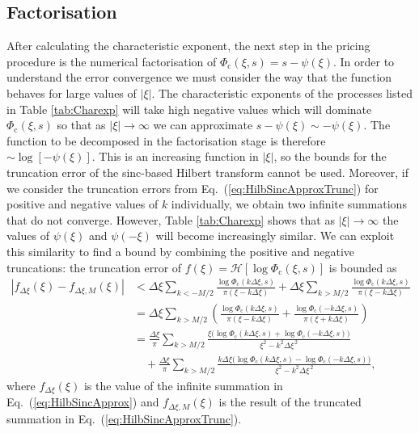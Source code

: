 \documentclass[11pt,a4paper]{article}
\begin{document}
\subsection{Factorisation}

After calculating the characteristic exponent, the next step in the pricing procedure is the numerical factorisation of $\Phi_{\mathrm{c}}(\xi,s)=s-\psi(\xi)$. In order to understand the error convergence we must consider the way that the function behaves for large values of $|\xi|$.
The characteristic exponents of the processes listed in Table \ref{tab:Charexp} will take high negative values which will dominate $\Phi_{\mathrm{c}}(\xi,s)$ so that as $|\xi|\rightarrow\infty$ we can approximate $s-\psi(\xi)\sim -\psi(\xi)$.
The function to be decomposed in the factorisation stage is therefore $\sim \log[-\psi(\xi)]$. This is an increasing function in $|\xi|$, so the bounds %
for the truncation error of the sinc-based Hilbert transform \cite[Theorems 6.4--6.6]{Feng2008} cannot be used. Moreover, if we consider the truncation errors from Eq.~(\ref{eq:HilbSincApproxTrunc}) for positive and negative values of $k$ individually, we obtain two infinite summations that do not converge. However, Table \ref{tab:Charexp} shows that as $|\xi|\rightarrow\infty$ the values of $\psi(\xi)$ and $\psi(-\xi)$ will become increasingly similar. We can exploit this similarity to find a bound by combining the positive and negative truncations: the truncation error of $f(\xi)=\mathcal{H}[ \log \Phi_{\mathrm{c}}(\xi,s)]$ is bounded as
\begin{align}
|f_{\Delta\xi}(\xi)-f_{\Delta\xi,M}(\xi)|&\! < \Delta\xi\! \sum_{k<-M/2}\!\frac{\log \Phi_{\mathrm{c}}(k\Delta\xi,s)}{\pi(\xi-k\Delta\xi)}+ \Delta\xi \sum_{k>M/2}\frac{\log \Phi_{\mathrm{c}}(k\Delta\xi,s)}{\pi(\xi-k\Delta\xi)}\nonumber\\
& = \Delta\xi \sum_{k>M/2}\left(\frac{\log \Phi_{\mathrm{c}}(k\Delta\xi,s)}{\pi(\xi-k\Delta\xi)}+ \frac{\log \Phi_{\mathrm{c}}(-k\Delta\xi,s)}{\pi(\xi+k\Delta\xi)}\right)\nonumber\\
& = \!\frac{\Delta\xi}{\pi}\!\sum_{k>M/2}\!\frac{\xi\big(\log \Phi_{\mathrm{c}}(k\Delta\xi,s)\!+\!\log \Phi_{\mathrm{c}}(-k\Delta\xi,s)\big)}{\xi^{2}-k^{2} \Delta\xi^{\,2}} \nonumber\\
&\quad +\!\frac{\Delta\xi}{\pi}\!\sum_{k>M/2}\!\frac{k\Delta\xi \big(\log \Phi_{\mathrm{c}}(k\Delta\xi,s)\!-\!\log \Phi_{\mathrm{c}}(-k\Delta\xi,s)\big)}{\xi^{2}-k^{2} \Delta\xi^{\,2}}, \label{eq:errorsum}
\end{align}
where $f_{\Delta\xi}(\xi)$ is the value of the infinite summation in Eq.~(\ref{eq:HilbSincApprox}) and $f_{\Delta\xi,M}(\xi)$ is the result of the truncated summation in Eq.~(\ref{eq:HilbSincApproxTrunc}).
\end{document}
